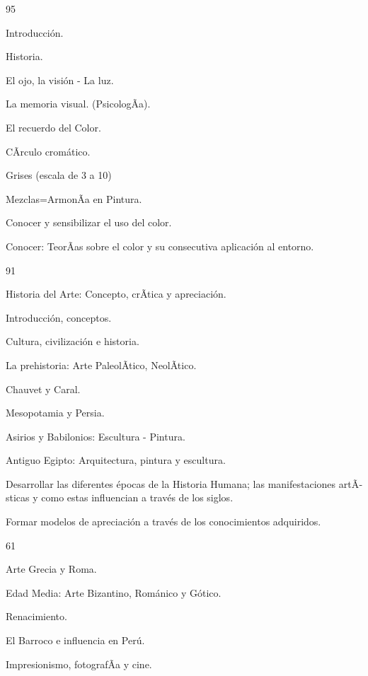 \begin{syllabus}
\begin{unit}{}{}{9}{5}
\begin{topics}
	\item Introducción.
	\item Historia.
	\item El ojo, la visión - La luz.
	\item La memoria visual. (PsicologÃ­a).
	\item El recuerdo del Color.
	\item CÃ­rculo cromático.
	\item Grises (escala de 3 a 10)
	\item Mezclas=ArmonÃ­a en Pintura.
\end{topics}
\begin{unitgoals}
	\item Conocer y sensibilizar el uso del color.
	\item Conocer: TeorÃ­as sobre el color y su consecutiva aplicación al entorno.
\end{unitgoals}
\end{unit}

\begin{unit}{}{}{9}{1}
\begin{topics}
	\item Historia del Arte: Concepto, crÃ­tica y apreciación.
	\item Introducción, conceptos.
	\item Cultura, civilización e historia.
	\item La prehistoria: Arte PaleolÃ­tico, NeolÃ­tico.
	\item Chauvet y Caral.
	\item Mesopotamia y Persia.
	\item Asirios y Babilonios: Escultura - Pintura.
	\item Antiguo Egipto: Arquitectura, pintura y escultura.
\end{topics}
\begin{unitgoals}
	\item Desarrollar las diferentes épocas de la Historia Humana; las manifestaciones artÃ­sticas y como estas influencian a través de los siglos.
	\item Formar modelos de apreciación a través de los conocimientos adquiridos.
\end{unitgoals}
\end{unit}

\begin{unit}{}{}{6}{1}
\begin{topics}
	\item Arte Grecia y Roma.
	\item Edad Media: Arte Bizantino, Románico y Gótico.
	\item Renacimiento.
	\item El Barroco e influencia en Perú.
	\item Impresionismo, fotografÃ­a y cine.
\end{topics}


\end{unit}
\end{syllabus}
